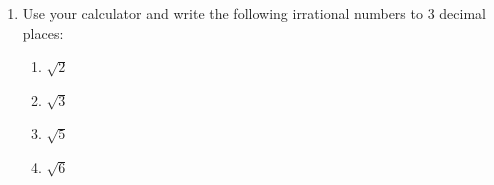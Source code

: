 \begin{enumerate}[noitemsep, label=\textbf{\arabic*}. ]
        \label{m38349*uid27}\item Use your calculator and write the following irrational numbers to 3 decimal places:
\label{m38349*id325991}\begin{enumerate}[noitemsep, label=\textbf{\alph*}. ] 
            \label{m38349*uid28}\item \begin{math}\sqrt{2}\end{math}\label{m38349*uid29}\item \begin{math}\sqrt{3}\end{math}\label{m38349*uid30}\item \begin{math}\sqrt{5}\end{math}\label{m38349*uid31}\item \begin{math}\sqrt{6}\end{math}\end{enumerate}
        

\end{enumerate}
